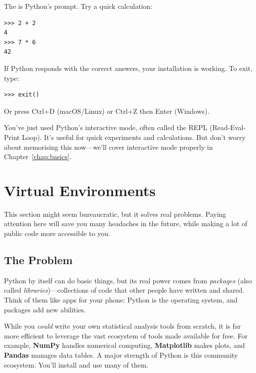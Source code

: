 The \py{>>>} is Python's prompt. Try a quick calculation:

\begin{lstlisting}
>>> 2 + 2
4
>>> 7 * 6
42
\end{lstlisting}

If Python responds with the correct answers, your installation is working. To exit, type:

\begin{lstlisting}
>>> exit()
\end{lstlisting}

Or press Ctrl+D (macOS/Linux) or Ctrl+Z then Enter (Windows).

\begin{tip}
You've just used Python's interactive mode, often called the REPL (Read-Eval-Print Loop). It's useful for quick experiments and calculations. But don't worry about memorising this now---we'll cover interactive mode properly in Chapter~\ref{chap:basics}.
\end{tip}


\section{Virtual Environments}
\label{sec:venv}

This section might seem bureaucratic, but it solves real problems. Paying attention here will save you many headaches in the future, while making a lot of public code more accessible to you.

\subsection{The Problem}

Python by itself can do basic things, but its real power comes from \emph{packages} (also called \emph{libraries})---collections of code that other people have written and shared. Think of them like apps for your phone: Python is the operating system, and packages add new abilities.

While you \emph{could} write your own statistical analysis tools from scratch, it is far more efficient to leverage the vast ecosystem of tools made available for free. For example, \textbf{NumPy} handles numerical computing, \textbf{Matplotlib} makes plots, and \textbf{Pandas} manages data tables. A major strength of Python is this community ecosystem. You'll install and use many of them.

